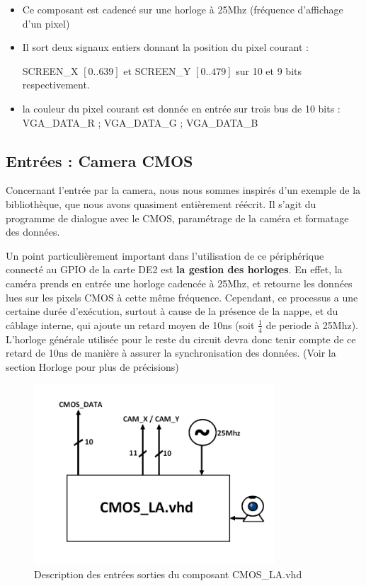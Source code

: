 \documentclass[10pt,a4paper]{report}
\begin{document}
\begin{itemize}
\item Ce composant est cadencé sur une horloge à 25Mhz (fréquence d'affichage d'un pixel)
\item Il sort deux signaux entiers donnant la position du pixel courant :

SCREEN\_X $\left[ 0 .. 639 \right]$ et SCREEN\_Y $\left[ 0 .. 479 \right]$ sur 10 et 9 bits respectivement.
\item la couleur du pixel courant est donnée en entrée sur trois bus de 10 bits : VGA\_DATA\_R ; VGA\_DATA\_G ; VGA\_DATA\_B
\end{itemize}

\subsection{Entrées : Camera CMOS}
Concernant l'entrée par la camera, nous nous sommes inspirés d'un exemple de la bibliothèque, que nous avons quasiment entièrement réécrit. Il s'agit du programme de dialogue avec le CMOS, paramétrage de la caméra et formatage des données.

Un point particulièrement important dans l'utilisation de ce périphérique connecté au GPIO de la carte DE2 est \textbf{la gestion des horloges}. En effet, la caméra prends en entrée une horloge cadencée à 25Mhz, et retourne les données lues sur les pixels CMOS à cette même fréquence. Cependant, ce processus a une certaine durée d'exécution, surtout à cause de la présence de la nappe, et du câblage interne, qui ajoute un retard moyen de 10ns (soit $\frac{1}{4}$ de periode à 25Mhz). L'horloge générale utilisée pour le reste du circuit devra donc tenir compte de ce retard de 10ns de manière à assurer la synchronisation des données. (Voir la section Horloge pour plus de précisions)

\begin{figure}[!h]
\centering
\includegraphics[width=255pt]{gfx/cmos_la.png}
\caption{Description des entrées sorties du composant CMOS\_LA.vhd}
\end{figure}
\end{document}
